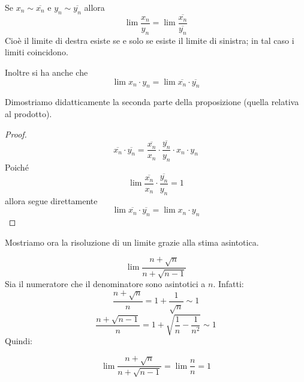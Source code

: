 \begin{proposition}
Se $x_n \sim \overline{x_n}$ e $y_n \sim \overline{y_n}$  allora
\begin{equation*}
\lim \frac{x_n}{y_n} = \lim \frac{\overline{x_n}}{\overline{y_n}}
\end{equation*}
Cioè il limite di destra esiste se e solo se esiste il limite di sinistra; in tal caso i limiti coincidono.

Inoltre si ha anche che
\begin{equation*}
\lim x_n \cdot y_n = \lim \overline{x_n} \cdot \overline{y_n}
\end{equation*}
\end{proposition}


Dimostriamo didatticamente la seconda parte della proposizione (quella relativa al prodotto).

\begin{proof}
\begin{equation*}
\overline{x_n} \cdot \overline{y_n} = \frac{\overline{x_n}}{x_n} \cdot \frac{\overline{y_n}}{y_n} \cdot x_n \cdot y_n
\end{equation*}
Poiché
\begin{equation*}
\lim \frac{\overline{x_n}}{x_n} \cdot \frac{\overline{y_n}}{y_n} = 1
\end{equation*}
allora segue direttamente
\begin{equation*}
\lim \overline{x_n} \cdot \overline{y_n} = \lim x_n \cdot y_n
\end{equation*}
\end{proof}

Mostriamo ora la risoluzione di un limite grazie alla stima asintotica.

\begin{example}
\begin{equation*}
\lim \frac{n + \sqrt{n}}{n + \sqrt{n-1}}
\end{equation*}
Sia il numeratore che il denominatore sono asintotici a $n$. Infatti:
\begin{equation*}
\frac{n + \sqrt{n}}{n} = 1 + \frac{1}{\sqrt{n}} \sim 1
\end{equation*}
\begin{equation*}
\frac{n + \sqrt{n-1}}{n} = 1 + \sqrt{\frac{1}{n} - \frac{1}{n^2}} \sim 1
\end{equation*}
Quindi:

\begin{equation*}
\lim \frac{n + \sqrt{n}}{n + \sqrt{n-1}} = \lim \frac{n}{n} = 1
\end{equation*}
\end{example}

